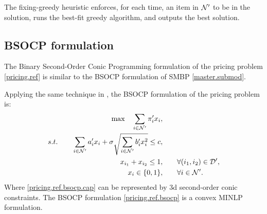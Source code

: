 The fixing-greedy heuristic  enforces, for each time, an item
in \(\mathcal N'\) to be in the solution, runs the best-fit greedy algorithm,  and outputs the best solution.

\begin{comment}
\textbf{Pruning strategy} The fixing-greedy heuristic calls the best-fit greedy heuristic \(|\cN'|\) times.
If the fixing-greedy heuristic is executed at the root node, we can speed up the algorithm using a \textit{dominance relation}. Between two items \(i_1 \in \cN\) and \(i_2 \in \cN\), if \(c_{i_1} \ge c_{i_2}\), \(a_{i_1} \le a_{i_2}\), and \(b_{i_1} \le b_{i_2}\), then the optimal solution to the pricing problem \eqref{pricing.ref} must have \(x_{i_1} \ge x_{i_2}\), so $i_2$ is dominated. Consequently, it suffices to fix non-dominated items in the fixing-greedy heuristic.

\end{comment}



\subsection{BSOCP formulation}

The Binary Second-Order Conic Programming formulation of the pricing problem \eqref{pricing.ref} is similar to the BSOCP formulation of SMBP \eqref{master.submod}.

Applying the same technique in ,
the BSOCP formulation of the pricing problem is:
    \begin{subequations}
    \label{pricing.ref.bsocp}
    \begin{align}
  		 \max \quad \sum_{i\in \mathcal N'} \pi'_i x_i, \qquad& \\
   	 s.t. \qquad  \sum_{i \in \mathcal N'} a'_i x_i  + \sigma\sqrt{\sum_{i\in \mathcal N'} b'_i x_i^2 } \le c,\qquad& \label{pricing.ref.bsocp.cap}\\
   	 x_{i_1} + x_{i_2} \le 1, \qquad & \forall (i_1, i_2) \in \mathcal D', \label{pricing.ref.bsocp.conflict}\\
   	 x_i \in \{0,1\},\qquad & \forall  i  \in \mathcal N'.
    \end{align}
    \end{subequations}
Where \eqref{pricing.ref.bsocp.cap} can be represented by 3d second-order conic constraints. The BSOCP formulation \eqref{pricing.ref.bsocp} is a convex MINLP formulation.

